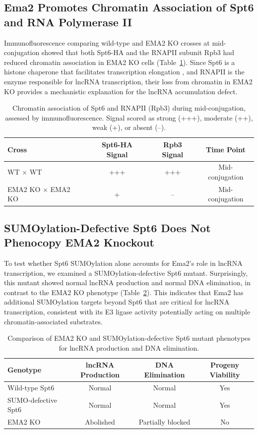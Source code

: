 \documentclass[11pt]{article}
\begin{document}
\subsection{Ema2 Promotes Chromatin Association of Spt6 and RNA Polymerase II}

Immunofluorescence comparing wild-type and EMA2 KO crosses at mid-conjugation showed that both Spt6-HA and the RNAPII subunit Rpb3 had reduced chromatin association in EMA2 KO cells (Table~\ref{tab:chromatin}). Since Spt6 is a histone chaperone that facilitates transcription elongation \citep{yoh2007spt6, ardehali2009spt6}, and RNAPII is the enzyme responsible for lncRNA transcription, their loss from chromatin in EMA2 KO provides a mechanistic explanation for the lncRNA accumulation defect.

\begin{table}[H]
\centering
\caption{Chromatin association of Spt6 and RNAPII (Rpb3) during mid-conjugation, assessed by immunofluorescence. Signal scored as strong (+++), moderate (++), weak (+), or absent (--).}
\label{tab:chromatin}
\begin{tabular}{lccc}
\toprule
\textbf{Cross} & \textbf{Spt6-HA Signal} & \textbf{Rpb3 Signal} & \textbf{Time Point} \\
\midrule
WT $\times$ WT & +++ & +++ & Mid-conjugation \\
EMA2 KO $\times$ EMA2 KO & + & -- & Mid-conjugation \\
\bottomrule
\end{tabular}
\end{table}

\subsection{SUMOylation-Defective Spt6 Does Not Phenocopy EMA2 Knockout}

To test whether Spt6 SUMOylation alone accounts for Ema2's role in lncRNA transcription, we examined a SUMOylation-defective Spt6 mutant. Surprisingly, this mutant showed normal lncRNA production and normal DNA elimination, in contrast to the EMA2 KO phenotype (Table~\ref{tab:spt6_mutant}). This indicates that Ema2 has additional SUMOylation targets beyond Spt6 that are critical for lncRNA transcription, consistent with its E3 ligase activity potentially acting on multiple chromatin-associated substrates.

\begin{table}[H]
\centering
\caption{Comparison of EMA2 KO and SUMOylation-defective Spt6 mutant phenotypes for lncRNA production and DNA elimination.}
\label{tab:spt6_mutant}
\begin{tabular}{lccc}
\toprule
\textbf{Genotype} & \textbf{lncRNA Production} & \textbf{DNA Elimination} & \textbf{Progeny Viability} \\
\midrule
Wild-type Spt6 & Normal & Normal & Yes \\
SUMO-defective Spt6 & Normal & Normal & Yes \\
EMA2 KO & Abolished & Partially blocked & No \\
\bottomrule
\end{tabular}
\end{table}
\end{document}
